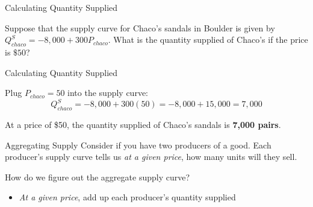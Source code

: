 \documentclass[12pt,t]{beamer}
\begin{document}
\begin{frame}{Calculating Quantity Supplied}

\bigskip
Suppose that the supply curve for Chaco's sandals in Boulder is given by $Q^S_{chaco} = -8,000 + 300P_{chaco}$. What is the quantity supplied of Chaco's if the price is $ \$ 50 $?

\end{frame}

\begin{frame}{Calculating Quantity Supplied}

\bigskip
Plug $P_{chaco} = 50$ into the supply curve:
$$
  Q^S_{chaco} = -8,000 + 300(50) = -8,000 + 15,000 = 7,000
$$

\bigskip
At a price of \$50, the quantity supplied of Chaco's sandals is \textbf{7,000 pairs}.
\end{frame}

\begin{frame}{Aggregating Supply}
  Consider if you have two producers of a good. Each producer's supply curve tells us \emph{at a given price}, how many units will they sell.

  \bigskip
  How do we figure out the aggregate supply curve? 
  
  \begin{itemize}
    \item \emph{At a given price}, add up each producer's quantity supplied
  \end{itemize}
\end{frame}
\end{document}
